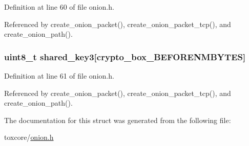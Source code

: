 Definition at line 60 of file onion.\+h.



Referenced by create\+\_\+onion\+\_\+packet(), create\+\_\+onion\+\_\+packet\+\_\+tcp(), and create\+\_\+onion\+\_\+path().

\hypertarget{struct_onion___path_ab9b6dd504522fbbb77500ab7e5d27121}{
\subsubsection[{shared\+\_\+key3}]{\setlength{\rightskip}{0pt plus 5cm}uint8\+\_\+t shared\+\_\+key3\mbox{[}crypto\+\_\+box\+\_\+\+B\+E\+F\+O\+R\+E\+N\+M\+B\+Y\+T\+E\+S\mbox{]}}}\label{struct_onion___path_ab9b6dd504522fbbb77500ab7e5d27121}


Definition at line 61 of file onion.\+h.



Referenced by create\+\_\+onion\+\_\+packet(), create\+\_\+onion\+\_\+packet\+\_\+tcp(), and create\+\_\+onion\+\_\+path().



The documentation for this struct was generated from the following file\+:\begin{DoxyCompactItemize}
\item 
toxcore/\hyperlink{onion_8h}{onion.\+h}\end{DoxyCompactItemize}
